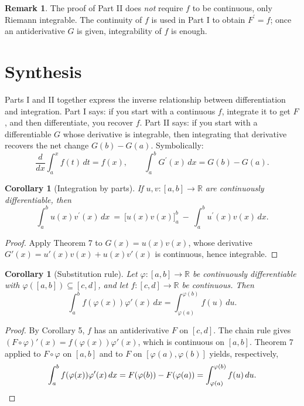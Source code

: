 \documentclass{article}
\newtheorem{corollary}[theorem]{Corollary}
\theoremstyle{definition}
\newtheorem{remark}[theorem]{Remark}
\begin{document}
\begin{remark}
The proof of Part II does \emph{not} require $f$ to be continuous, only Riemann integrable. The continuity of $f$ is used in Part I to obtain $F^{\prime}=f$; once an antiderivative $G$ is given, integrability of $f$ is enough.
\end{remark}

\section{Synthesis}

Parts I and II together express the inverse relationship between differentiation and integration. Part I says: if you start with a continuous $f$, integrate it to get $F$, and then differentiate, you recover $f$. Part II says: if you start with a differentiable $G$ whose derivative is integrable, then integrating that derivative recovers the net change $G(b)-G(a)$. Symbolically:
$$\frac{d}{dx}\!\int_{a}^{x}f(t)\,dt=f(x),\qquad\int_{a}^{b}G^{\prime}(x)\,dx=G(b)-G(a).$$

\begin{corollary}[Integration by parts]
If $u,v\colon[a,b]\to\mathbb{R}$ are continuously differentiable, then
$$\int_{a}^{b}u(x)v^{\prime}(x)\,dx\ =\ \bigl[u(x)v(x)\bigr]_{a}^{b}\ -\ \int_{a}^{b}u^{\prime}(x)v(x)\,dx.$$
\end{corollary}

\begin{proof}
Apply Theorem 7 to $G(x) = u(x)v(x)$, whose derivative $G'(x) = u'(x)v(x) + u(x)v'(x)$ is continuous, hence integrable.
\end{proof}

\begin{corollary}[Substitution rule]
Let $\varphi \colon [a,b] \to \mathbb{R}$ be continuously differentiable with $\varphi([a,b]) \subseteq [c,d]$, and let $f \colon [c,d] \to \mathbb{R}$ be continuous. Then
$$\int_{a}^{b} f(\varphi(x)) \varphi'(x)\,dx = \int_{\varphi(a)}^{\varphi(b)} f(u)\,du.$$
\end{corollary}

\begin{proof}
By Corollary 5, $f$ has an antiderivative $F$ on $[c,d]$. The chain rule gives $(F \circ \varphi)'(x) = f(\varphi(x))\varphi'(x)$, which is continuous on $[a,b]$. Theorem 7 applied to $F \circ \varphi$ on $[a,b]$ and to $F$ on $[\varphi(a),\varphi(b)]$ yields, respectively,
$$\int_{a}^{b} f(\varphi(x)) \varphi'(x)\,dx = F(\varphi(b)) - F(\varphi(a)) = \int_{\varphi(a)}^{\varphi(b)} f(u)\,du.\qedhere$$
\end{proof}
\end{document}
